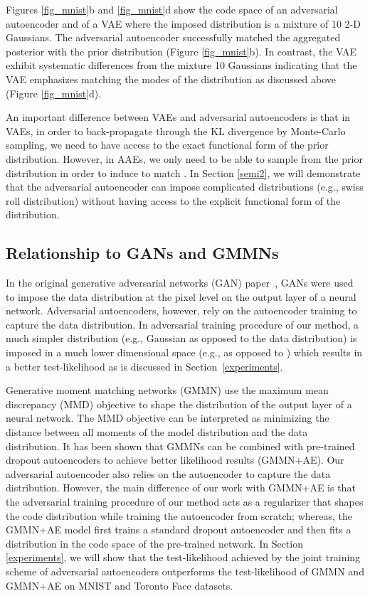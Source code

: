\documentclass{article}
\begin{document}
Figures \ref{fig_mnist}b and \ref{fig_mnist}d show the code space of an adversarial autoencoder and of a VAE where the imposed distribution is a mixture of 10 2-D Gaussians.
The adversarial autoencoder successfully matched the aggregated posterior with the prior distribution (Figure \ref{fig_mnist}b).
In contrast, the VAE exhibit systematic differences from the mixture 10 Gaussians indicating that the VAE emphasizes matching the modes of the distribution as discussed above (Figure \ref{fig_mnist}d).

An important difference between VAEs and adversarial autoencoders is that in VAEs, in order to back-propagate through the KL divergence by Monte-Carlo sampling, we need to have access to the exact functional form of the prior distribution.
However, in AAEs, we only need to be able to sample from the prior distribution in order to induce  to match . In Section \ref{semi2}, we will demonstrate that the adversarial autoencoder can impose complicated distributions (e.g., swiss roll distribution) without having access to the explicit functional form of the distribution.


\subsection{Relationship to GANs and GMMNs}\label{gmmn}

In the original generative adversarial networks (GAN) paper~\citep{gan}, GANs were used to impose the data distribution at the pixel level on the output layer of a neural network. Adversarial autoencoders, however, rely on the autoencoder training to capture the data distribution. In adversarial training procedure of our method, a much simpler distribution (e.g., Gaussian as opposed to the data distribution) is imposed in a much lower dimensional space (e.g.,  as opposed to ) which results in a better test-likelihood as is discussed in Section~\ref{experiments}.

Generative moment matching networks (GMMN) \citep{gmmn} use the maximum mean discrepancy (MMD) objective to shape the distribution of the output layer of a neural network. The MMD objective can be interpreted as minimizing the distance between all moments of the model distribution and the data distribution. It has been shown that GMMNs can be combined with pre-trained dropout autoencoders to achieve better likelihood results (GMMN+AE). Our adversarial autoencoder also relies on the autoencoder to capture the data distribution. However, the main difference of our work with GMMN+AE is that the adversarial training procedure of our method acts as a regularizer that shapes the code distribution while training the autoencoder from scratch; whereas, the GMMN+AE model first trains a standard dropout autoencoder and then fits a distribution in the code space of the pre-trained network. In Section \ref{experiments}, we will show that the test-likelihood achieved by the joint training scheme of adversarial autoencoders outperforms the test-likelihood of GMMN and GMMN+AE on MNIST and Toronto Face datasets.
\end{document}
